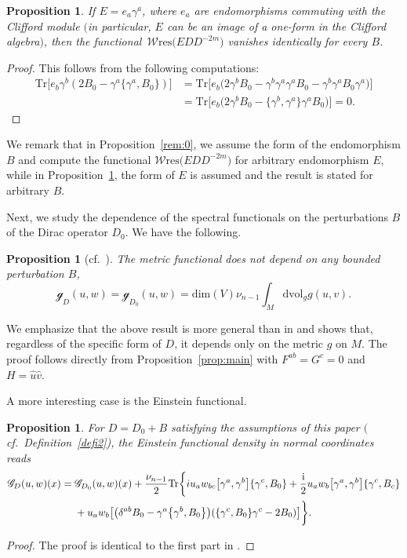\documentclass[10pt,a4paper]{amsart}
\numberwithin{equation}{section}
\newtheorem{Proposition}[Theorem]{Proposition}
\theoremstyle{definition}
\def\W{\mathscr{W} \mathrm{res}}
\def\Tr{\mathrm{Tr}}
\def\dv{\mathrm{dvol}_g}
\begin{document}
\begin{Proposition}
	\label{rem:1}
	If $E=e_a\gamma^a$, where $e_a$ are endomorphisms commuting with the Clifford module $($in particular, $E$ can be an image of a one-form in the Clifford algebra$)$, then the functional~$\W\bigl(EDD^{-2m}\bigr)$ vanishes identically for every $B$.
\end{Proposition}
\begin{proof}
	This follows from the following computations:
		\begin{align*}
			\Tr\bigl[e_b\gamma^b(2B_0-\gamma^a\{\gamma^a,B_0\})\bigr]&=\Tr \bigl[e_b\bigl(2\gamma^bB_0-\gamma^b\gamma^a\gamma^aB_0-\gamma^b\gamma^aB_0\gamma^a\bigr)\bigr]\\
			&=\Tr \bigl[ e_b\bigl(2\gamma^bB_0-\bigl\{\gamma^b,\gamma^a\bigr\}\gamma^aB_0\bigr)\bigr]=0.\tag*{\qed}
		\end{align*}\renewcommand{\qed}{}
\end{proof}

We remark that in Proposition~\ref{rem:0}, we assume the form of the endomorphism $B$ and compute the functional $\W\bigl(EDD^{-2m}\bigr)$ for arbitrary endomorphism $E$, while in Proposition~\ref{rem:1}, the form of $E$ is assumed and the result is stated for arbitrary $B$.

Next, we study the dependence of the spectral functionals on the perturbations $B$ of the Dirac operator $D_0$. We have the following.


\begin{Proposition}[{cf.\ \cite[Theorem~4.1]{dabrowski2023}}]
	\label{prop:met}
	The metric functional does not depend on any bounded perturbation $B$,
	\[
		\mathscr{g}_D(u,w) = \mathscr{g}_{D_0}(u,w) = \mathrm{dim}(V)
		\nu_{n-1} \int_M \dv g(u,v).
	\]
\end{Proposition}
We emphasize that the above result is more general than in \cite[Theorem~4.1]{dabrowski2023} and shows that, regardless of the specific form of $D$, it depends only on the metric $g$ on $M$. The proof follows directly from Proposition~\ref{prop:main} with $F^{ab}=G^c=0$ and $H=\hat{u}\hat{v}$.

A more interesting case is the Einstein functional.
\begin{Proposition}
	\label{prop:Ein}
	For $D=D_0+B$ satisfying the assumptions of this paper $($cf.\ Definition~{\rm\ref{defi2})}, the Einstein functional density in normal coordinates reads
		\begin{align*}%
			\mathscr{G}_D(u,w)(x)={} &\mathscr{G}_{D_0}(u,w)(x)
			+\frac{\nu_{n-1}}{2} %
			\Tr\biggl\{ iu_aw_{bc}\big[\gamma^a,\gamma^b\big]\{\gamma^c, B_0\}+\frac{\rm i}{2}u_aw_{b}\bigl[\gamma^a,\gamma^b\bigr]\{\gamma^c, B_c\} \\
			& +u_aw_b\bigl[\bigl(\delta^{ab}B_0-\gamma^a\bigl\{\gamma^b,B_0\bigr\}\bigr)(\{\gamma^c,B_0\}\gamma^c-2B_0)\bigr]\biggr\}.
		\end{align*}
\end{Proposition}
\begin{proof}
	The proof is identical to the first part in \cite[Proposition~II.1]{bochniak2025}.
\end{proof}
\end{document}
